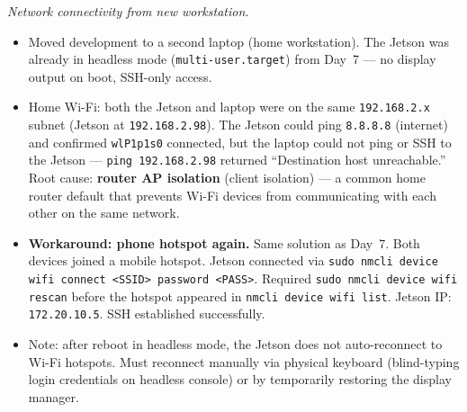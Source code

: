\documentclass{article}
\theoremstyle{plain}
\theoremstyle{definition}
\theoremstyle{remark}
\begin{document}
\textit{Network connectivity from new workstation.}
\begin{itemize}
\item Moved development to a second laptop (home workstation). The Jetson was already in headless mode (\texttt{multi-user.target}) from Day~7 --- no display output on boot, SSH-only access.
\item Home Wi-Fi: both the Jetson and laptop were on the same \texttt{192.168.2.x} subnet (Jetson at \texttt{192.168.2.98}). The Jetson could ping \texttt{8.8.8.8} (internet) and confirmed \texttt{wlP1p1s0} connected, but the laptop could not ping or SSH to the Jetson --- \texttt{ping 192.168.2.98} returned ``Destination host unreachable.'' Root cause: \textbf{router AP isolation} (client isolation) --- a common home router default that prevents Wi-Fi devices from communicating with each other on the same network.
\item \textbf{Workaround: phone hotspot again.} Same solution as Day~7. Both devices joined a mobile hotspot. Jetson connected via \texttt{sudo nmcli device wifi connect <SSID> password <PASS>}. Required \texttt{sudo nmcli device wifi rescan} before the hotspot appeared in \texttt{nmcli device wifi list}. Jetson IP: \texttt{172.20.10.5}. SSH established successfully.
\item Note: after reboot in headless mode, the Jetson does not auto-reconnect to Wi-Fi hotspots. Must reconnect manually via physical keyboard (blind-typing login credentials on headless console) or by temporarily restoring the display manager.
\end{itemize}
\end{document}
